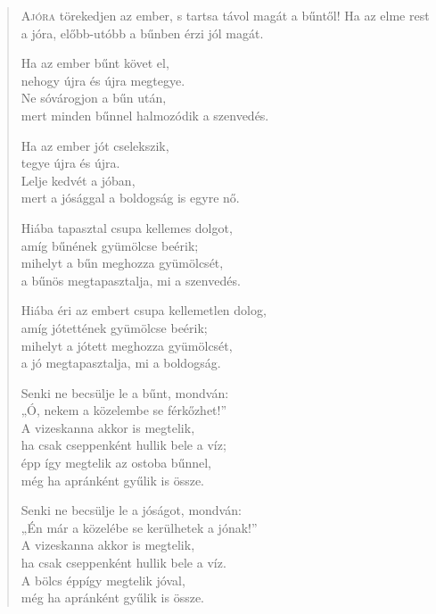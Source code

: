 
\begin{verse}

{\par%
\lettrine{A}{jóra} {\LettrineTextFont törekedjen az ember,}\newline
s tartsa távol magát a bűntől!\newline
Ha az elme rest a jóra,\verselinebreak
előbb-utóbb a bűnben érzi jól magát.
\par}

 Ha az ember bűnt követ el,\\
nehogy újra és újra megtegye.\\
Ne sóvárogjon a bűn után,\\
mert minden bűnnel halmozódik a szenvedés.

 Ha az ember jót cselekszik,\\
tegye újra és újra.\\
Lelje kedvét a jóban,\\
mert a jósággal a boldogság is egyre nő.

 Hiába tapasztal csupa kellemes dolgot,\\
amíg bűnének gyümölcse beérik;\\
mihelyt a bűn meghozza gyümölcsét,\\
a bűnös megtapasztalja, mi a szenvedés.

 Hiába éri az embert csupa kellemetlen dolog,\\
amíg jótettének gyümölcse beérik;\\
mihelyt a jótett meghozza gyümölcsét,\\
a jó megtapasztalja, mi a boldogság.

 Senki ne becsülje le a bűnt, mondván:\\
„Ó, nekem a közelembe se férkőzhet!”\\
A vizeskanna akkor is megtelik,\\
ha csak cseppenként hullik bele a víz;\\
épp így megtelik az ostoba bűnnel,\\
még ha apránként gyűlik is össze.

 Senki ne becsülje le a jóságot, mondván:\\
„Én már a közelébe se kerülhetek a jónak!”\\
A vizeskanna akkor is megtelik,\\
ha csak cseppenként hullik bele a víz.\\
A bölcs éppígy megtelik jóval,\\
még ha apránként gyűlik is össze.


\end{verse}
